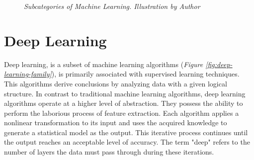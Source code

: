 \begin{figure}[H]
  \centering
    \caption[Subcategories of Machine Learning.]{\textit{Subcategories of Machine Learning. Illustration by Author}}
    {\label{fig:ml_branches}}
\end{figure}


\section{Deep Learning}

Deep learning, is a subset of machine learning algorithms (\textit{Figure
\ref{fig:deep-learning-family}}), is primarily associated with supervised
learning techniques. This algorithms derive conclusions by analyzing data with
a given logical structure. In contrast to traditional machine learning
algorithms, deep learning algorithms operate at a higher level of abstraction.
They possess the ability to perform the laborious process of feature
extraction. Each algorithm applies a nonlinear transformation to its input and
uses the acquired knowledge to generate a statistical model as the output. This
iterative process continues until the output reaches an acceptable level of
accuracy. The term "deep" refers to the number of layers the data must pass
through during these iterations. \newline


